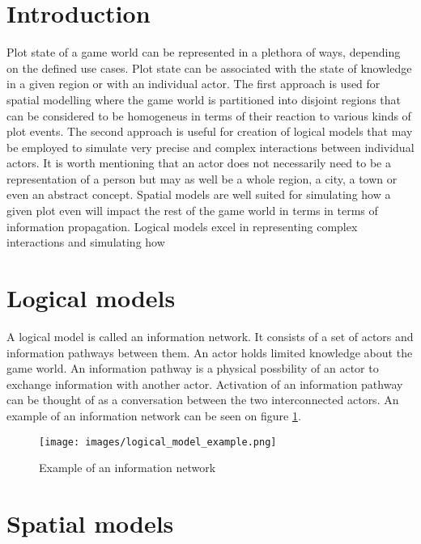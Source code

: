 
\section{Introduction}

Plot state of a game world can be represented in a plethora of ways, depending on the defined use cases.
Plot state can be associated with the state of knowledge in a given region or with an individual actor.
The first approach is used for spatial modelling where the game world is partitioned into disjoint regions that can be considered to be homogeneus in terms of their reaction to various kinds of plot events.
The second approach is useful for creation of logical models that may be employed to simulate very precise and complex interactions between individual actors.
It is worth mentioning that an actor does not necessarily need to be a representation of a person but may as well be a whole region, a city, a town or even an abstract concept.
Spatial models are well suited for simulating how a given plot even will impact the rest of the game world in terms in terms of information propagation.
Logical models excel in representing complex interactions and simulating how

\section{Logical models}

A logical model is called an information network.
It consists of a set of actors and information pathways between them.
An actor holds limited knowledge about the game world.
An information pathway is a physical possbility of an actor to exchange information with another actor.
Activation of an information pathway can be thought of as a conversation between the two interconnected actors.
An example of an information network can be seen on figure \ref{fig:logical_model_example}.

\begin{figure}
    \centering
    \texttt{[image: images/logical\_model\_example.png]}
    \caption{Example of an information network}\label{fig:logical_model_example}
\end{figure}

\section{Spatial models}

